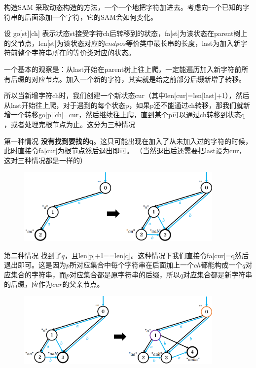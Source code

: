 \documentclass{beamer}
\begin{document}
\begin{frame}{构造SAM}
    \small
采取动态构造的方法，一个一个地把字符加进去。考虑向一个已知的字符串的后面添加一个字符，它的SAM会如何变化。

\pause \vspace{1em}
设 go[st][ch] 表示状态st接受字符ch后转移到的状态，fa[st]为该状态在parent树上的父节点，len[st]为该状态对应的$endpos$等价类中最长串的长度，last为加入新字符前整个字符串所在的等价类对应的状态。

\pause \vspace{1em}
一个基本的观察是：从last开始在parent树上往上爬，一定能遍历加入新字符前所有后缀的对应节点。加入一个新的字符，其实就是给之前部分后缀新增了转移。

\pause \vspace{1em}
所以当新增字符ch时，我们创建一个新状态cur（其中len[cur]=len[last]+1），然后从last开始往上爬，对于遇到的每个状态p，如果p还不能通过ch转移，那我们就新增一个转移go[p][ch]=cur，然后继续往上爬，直到某个p可以通过ch转移到状态q ，或者处理完根节点为止。这分为三种情况
\end{frame}

\begin{frame}{第一种情况}
    \small
    \textbf{没有找到要找的q}。这只可能出现在加入了从未加入过的字符的时候，此时直接令fa[cur]为根节点然后退出即可。 （当然退出后还需要把last设为cur，这对三种情况都是一样的）
    
    \begin{figure}[H]
        \centering
        \includegraphics[width=0.9\textwidth]{pic/case1.png}
    \end{figure}
\end{frame}

\begin{frame}{第二种情况}
    \small
    找到了$q$，且len[p]+1==len[q]。这种情况下我们直接令fa[cur]=q然后退出即可。这是因为$p$所对应集合中每个字符串在后面加上一个$ch$都能构成一个$q$对应集合的字符串，而$p$对应集合都是原字符串的后缀，所以$q$对应集合都是新字符串的后缀，应作为$cur$的父亲节点。

    \begin{figure}[H]
        \centering
        \includegraphics[width=0.9\textwidth]{pic/case2.png}
    \end{figure}
\end{frame}
\end{document}

